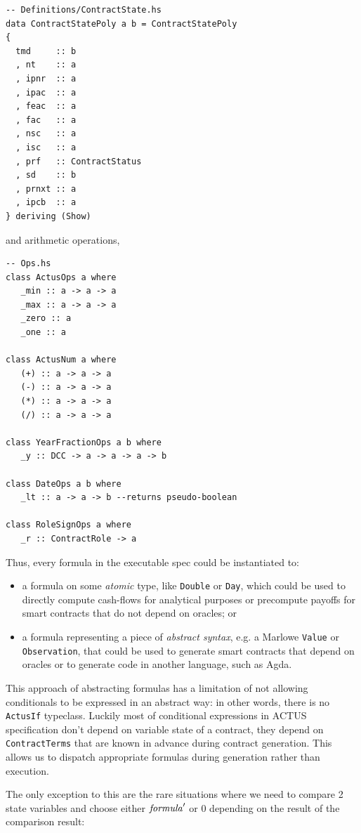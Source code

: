 \documentclass[runningheads]{llncs}
\newcommand{\ident}[1]{\mbox{\emph{#1}}}
\begin{document}
\begin{verbatim}
-- Definitions/ContractState.hs 
data ContractStatePoly a b = ContractStatePoly  
{  
  tmd     :: b  
  , nt    :: a  
  , ipnr  :: a  
  , ipac  :: a  
  , feac  :: a  
  , fac   :: a  
  , nsc   :: a  
  , isc   :: a  
  , prf   :: ContractStatus  
  , sd    :: b  
  , prnxt :: a  
  , ipcb  :: a  
} deriving (Show) 
\end{verbatim}
\noindent
and arithmetic operations,
\begin{verbatim}
-- Ops.hs
class ActusOps a where    
   _min :: a -> a -> a
   _max :: a -> a -> a
   _zero :: a
   _one :: a

class ActusNum a where
   (+) :: a -> a -> a
   (-) :: a -> a -> a
   (*) :: a -> a -> a
   (/) :: a -> a -> a

class YearFractionOps a b where
   _y :: DCC -> a -> a -> a -> b   

class DateOps a b where
   _lt :: a -> a -> b --returns pseudo-boolean   

class RoleSignOps a where
   _r :: ContractRole -> a
\end{verbatim}
\noindent
Thus, every formula in the executable spec could be instantiated
to: 
\begin{itemize}
\item a formula on some \emph{atomic} type, like \texttt{Double} or \texttt{Day}, which could be used
to directly compute cash-flows for analytical purposes or precompute
payoffs for smart contracts that do not depend on oracles; or 
\item a formula representing a piece of \emph{abstract syntax}, e.g. a Marlowe \texttt{Value} or \texttt{Observation}, that could
be used to generate smart contracts that depend on oracles or to generate
code in another language, such as Agda.
\end{itemize}
This approach of abstracting formulas has a limitation of not allowing
conditionals to be expressed in an abstract way: in other words, there is no \texttt{ActusIf}
typeclass. Luckily most of conditional expressions in ACTUS specification
don't depend on variable state of a contract, they depend on \texttt{ContractTerms}
that are known in advance during contract generation. This allows
us to dispatch appropriate formulas during generation rather than
execution.

The only exception to this are the rare situations where we need to compare
2 state variables and choose either $\ident{formula}^\prime$ or 0 depending on the result of the comparison
result:
\end{document}
